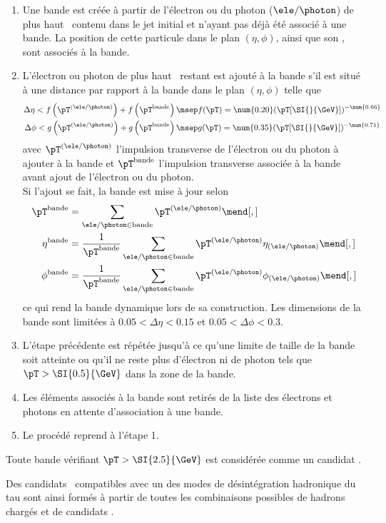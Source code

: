 \begin{enumerate}
\item Une bande est créée à partir de l'électron ou du photon ($\ele/\photon$) de plus haut \pT\ contenu dans le jet initial et n'ayant pas déjà été associé à une bande. La position de cette particule dans le plan $(\eta,\phi)$, ainsi que son \pT, sont associés à la bande.
\item L'électron ou photon de plus haut \pT\ restant est ajouté à la bande s'il est situé à une distance par rapport à la bande dans le plan $(\eta,\phi)$ telle que
\begin{align}
\Delta\eta < f\left(\pT^{(\ele/\photon)}\right) + f\left(\pT^\text{bande}\right) \msep& f(\pT) = \num{0.20} (\pT [\SI{}{\GeV}])^{-\num{0.66}}\\
\Delta\phi < g\left(\pT^{(\ele/\photon)}\right) + g\left(\pT^\text{bande}\right) \msep& g(\pT) = \num{0.35} (\pT [\SI{}{\GeV}])^{-\num{0.71}}
\end{align}
avec $\pT^{(\ele/\photon)}$ l'impulsion transverse de l'électron ou du photon à ajouter à la bande et $\pT^\text{bande}$ l'impulsion transverse associée à la bande avant ajout de l'électron ou du photon.\\
Si l'ajout se fait, la bande est mise à jour selon
\begin{align}
\pT^\text{bande} &= \sum_{\ele/\photon\in\text{bande}}\pT^{(\ele/\photon)}\mend[,]\\
\eta^\text{bande} &= \frac{1}{\pT^\text{bande}} \sum_{\ele/\photon\in\text{bande}}\pT^{(\ele/\photon)} \eta_{(\ele/\photon)}\mend[,]\\
\phi^\text{bande} &= \frac{1}{\pT^\text{bande}} \sum_{\ele/\photon\in\text{bande}}\pT^{(\ele/\photon)} \phi_{(\ele/\photon)}\mend[,]
\end{align}
ce qui rend la bande dynamique lors de sa construction.
Les dimensions de la bande sont limitées à $\num{0.05}<\Delta\eta<\num{0.15}$ et $\num{0.05}<\Delta\phi<\num{0.3}$.
\item L'étape précédente est répétée jusqu'à ce qu'une limite de taille de la bande soit atteinte ou qu'il ne reste plus d'électron ni de photon tels que $\pT>\SI{0.5}{\GeV}$ dans la zone de la bande.
\item Les éléments associés à la bande sont retirés de la liste des électrons et photons en attente d'association à une bande.
\item Le procédé reprend à l'étape 1.
\end{enumerate}
Toute bande vérifiant $\pT>\SI{2.5}{\GeV}$ est considérée comme un candidat \pionnull.
\par
Des candidats \tauh\ compatibles avec un des modes de désintégration hadronique du tau sont ainsi formés à partir de toutes les combinaisons possibles de hadrons chargés et de candidats \pionnull.
